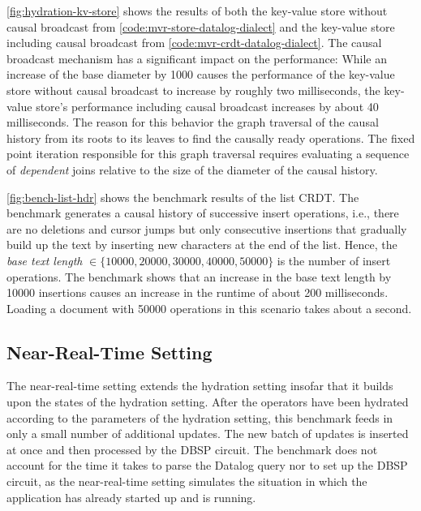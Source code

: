 

\ref{fig:hydration-kv-store} shows the results of both the key-value store
without causal broadcast from \ref{code:mvr-store-datalog-dialect} and the
key-value store including causal broadcast from \ref{code:mvr-crdt-datalog-dialect}.
The causal broadcast mechanism has a significant impact on the performance:
While an increase of the base diameter by 1000 causes the performance of the
key-value store without causal broadcast to increase by roughly two milliseconds,
the key-value store's performance including causal broadcast increases by about
40 milliseconds.
The reason for this behavior the graph traversal of the causal history from its
roots to its leaves to find the causally ready operations.
The fixed point iteration responsible for this graph traversal requires evaluating
a sequence of \emph{dependent} joins relative to the size of the diameter
of the causal history.



\ref{fig:bench-list-hdr} shows the benchmark results of the list \ac{CRDT}.
The benchmark generates a causal history of successive insert operations, i.e.,
there are no deletions and cursor jumps but only consecutive insertions that
gradually build up the text by inserting new characters at the end of the list.
Hence, the \emph{base text length} \(\in \{10000, 20000, 30000, 40000, 50000\}\)
is the number of insert operations.
The benchmark shows that an increase in the base text length by 10000 insertions
causes an increase in the runtime of about 200 milliseconds.
Loading a document with 50000 operations in this scenario takes about a second.

\subsection{Near-Real-Time Setting}\label{sec:bench-nrt}

The near-real-time setting extends the hydration setting insofar that it builds
upon the states of the hydration setting.
After the operators have been hydrated according to the parameters of the
hydration setting, this benchmark feeds in only a small number of additional updates.
The new batch of updates is inserted at once and then processed by the DBSP circuit.
The benchmark does not account for the time it takes to parse the Datalog query
nor to set up the DBSP circuit, as the near-real-time setting simulates
the situation in which the application has already started up and is running.

